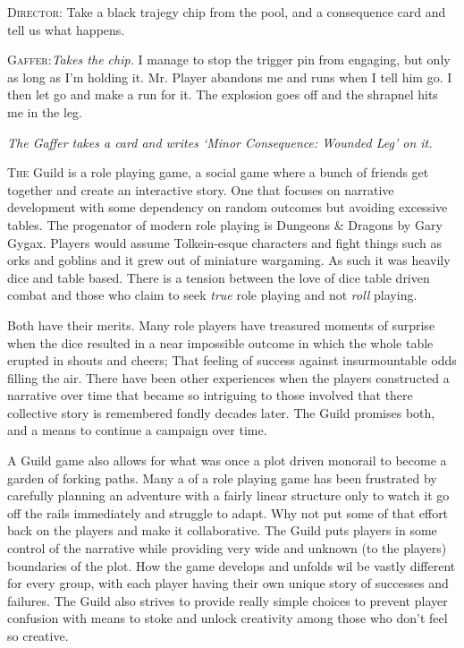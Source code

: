 \textsc{Director:} Take a black trajegy chip from the pool, and a consequence card and tell us what happens.

\textsc{Gaffer:}\textit{Takes the chip.} I manage to stop the trigger pin from engaging, but only as long as I'm holding it. Mr. Player abandons me and runs when I tell him go. I then let go and make a run for it. The explosion goes off and the shrapnel hits me in the leg.

\textit{The Gaffer takes a card and writes `Minor Consequence: Wounded Leg' on it.}

\vspace{5mm}

\lettrine{\initbg T}{he} Guild is a role playing game, a social game where a bunch of friends get together and create an
interactive story. One that focuses on narrative development with some dependency on random outcomes but avoiding excessive tables. The progenator of modern role playing is Dungeons \& Dragons by Gary Gygax. Players would assume Tolkein-esque characters and fight things such as orks and goblins and it grew out of miniature wargaming. As such it was heavily dice and table based. There is a tension between the love of dice table driven combat and those who claim to seek \emph{true} role playing and not \emph{roll} playing.
  
Both have their merits. Many role players have treasured moments 
of surprise when the dice resulted in a near impossible outcome in which the whole table erupted
in shouts and cheers; That feeling of success against insurmountable odds filling the air. There
have been other experiences when the players constructed a narrative over time that became so
intriguing to those involved that there collective story is remembered fondly decades later. The Guild promises both, and a means to continue a campaign over time.

A Guild game also allows for what was once a plot driven monorail to become a garden of forking paths. Many a  of a role playing game has been frustrated by carefully planning an adventure with a fairly linear structure only to watch it go off the rails immediately and struggle to adapt. Why not 
put some of that effort back on the players and make it collaborative. The Guild puts players in some control of the narrative while providing very wide and unknown (to the players) boundaries of the plot. How the game develops and unfolds wil be vastly different for every group, with each player having their own unique story of successes and failures. The Guild also strives to provide really simple choices to prevent player confusion with means to stoke and unlock creativity among those who don't feel so creative.

